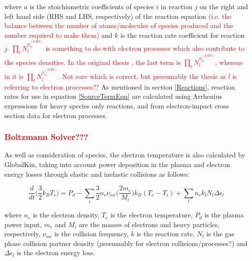\documentclass[11pt, oneside]{article}   	%
\begin{document}
where $a$ is the stoichiometric coefficients of species $i$ in reaction $j$ on the right and left hand side (RHS and LHS, respectively) of the reaction equation \textcolor{red}{(i.e. the balance between the number of atoms/molecules of species produced and the number required to make them)} and $k$ is the reaction rate coefficient for reaction $j$.
\textcolor{red}{ $\prod_lN_l^{a_{ij}^{(LHS)}}$ is something to do with electron processes which also contribute to the species densities. 
In the original thesis \cite{Dorai2002modeling}, the last term is $\prod_lN_l^{a_{lj}^{(LHS)}}$, whereas in \cite{Stafford2004O2} it is $\prod_lN_l^{a_{ij}^{(LHS)}}$. 
Not sure which is correct, but presumably the thesis as $l$ is referring to electron processes??}
As mentioned in section \ref{Reactions}, reaction rates for use in equation \ref{SourceTermEqn} are calculated using Arrhenius expressions for heavy species only reactions, and from electron-impact cross section data for electron processes. 

\subsubsection*{\textcolor{red}{Boltzmann Solver???}}

As well as consideration of species, the electron temperature is also calculated by GlobalKin, taking into account power deposition in the plasma and electron energy losses through elastic and inelastic collisions as follows:

\begin{equation}
\frac{d}{dt}\Big(\frac{3}{2}k_BT_e\Big) = P_d - \sum_i\frac{3}{2}n_e\nu_{mi}\Big(\frac{2m_e}{M_i}\Big)k_B(T_e - T_i) + \sum_l n_ek_lN_l\Delta\epsilon_l
\label{ElectronTempEqn}
\end{equation}

where $n_e$ is the electron density, $T_e$ is the electron temperature, $P_d$ is the plasma power input, $m_e$ and $M_i$ are the masses of electrons and heavy particles, respectively, $\nu_{mi}$ is the collision frequency, $k$ is the reaction rate, $N_l$ is the gas phase collision partner density (presumably for electron collisions/processes?) and $\Delta\epsilon_l$ is the electron energy loss.
\end{document}
